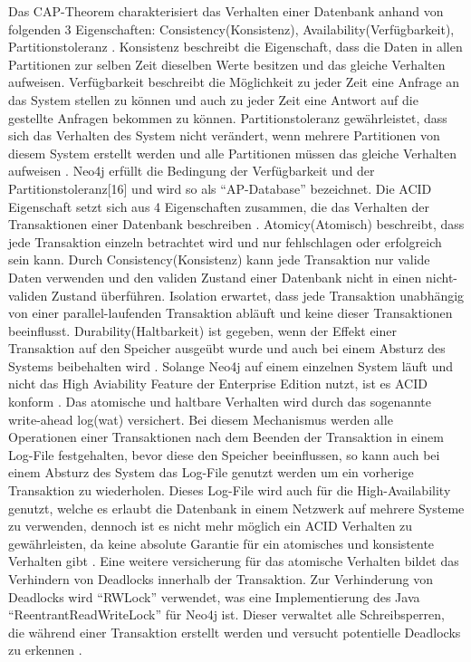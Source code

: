 Das CAP-Theorem charakterisiert  das Verhalten einer Datenbank anhand von folgenden 3 Eigenschaften: Consistency(Konsistenz), Availability(Verfügbarkeit), Partitionstoleranz \parencite{simon2000brewer}. Konsistenz beschreibt die Eigenschaft, dass die Daten in allen Partitionen zur selben Zeit dieselben Werte besitzen und das gleiche Verhalten aufweisen. Verfügbarkeit beschreibt die Möglichkeit zu jeder Zeit eine Anfrage an das System stellen zu können und auch zu jeder Zeit eine Antwort auf die gestellte Anfragen bekommen zu können. Partitionstoleranz gewährleistet, dass sich das Verhalten des System nicht verändert, wenn mehrere Partitionen von diesem System erstellt werden und alle Partitionen müssen das gleiche Verhalten aufweisen  \parencite{simon2000brewer}. Neo4j erfüllt die Bedingung der Verfügbarkeit und der  Partitionstoleranz[16] und wird so als “AP-Database” bezeichnet. \newline
Die ACID Eigenschaft setzt sich aus 4 Eigenschaften zusammen, die das Verhalten der Transaktionen einer  Datenbank beschreiben \parencite{haerder1983principles}. Atomicy(Atomisch) beschreibt, dass jede Transaktion einzeln betrachtet wird und nur fehlschlagen oder erfolgreich sein kann. Durch Consistency(Konsistenz) kann jede Transaktion nur valide Daten verwenden und den validen Zustand einer Datenbank nicht in einen nicht-validen Zustand überführen. Isolation erwartet, dass jede Transaktion unabhängig von einer parallel-laufenden Transaktion abläuft und keine dieser Transaktionen beeinflusst. Durability(Haltbarkeit) ist gegeben, wenn der Effekt einer Transaktion auf den Speicher ausgeübt wurde und auch bei einem Absturz des Systems beibehalten wird \parencite{haerder1983principles}. Solange Neo4j auf einem einzelnen System läuft und nicht das High Aviability Feature der Enterprise Edition nutzt, ist es ACID konform \parencite{holzschuher2013performance}. Das atomische und haltbare Verhalten wird durch das sogenannte write-ahead log(wat) versichert. Bei diesem Mechanismus  werden alle Operationen einer Transaktionen nach dem Beenden der Transaktion in einem Log-File  festgehalten, bevor diese  den Speicher beeinflussen, so kann auch bei einem Absturz des System das Log-File genutzt werden um ein vorherige Transaktion zu wiederholen.  Dieses Log-File wird auch für die High-Availability  genutzt, welche es erlaubt die Datenbank in einem Netzwerk auf mehrere Systeme zu verwenden, dennoch ist es nicht mehr möglich ein  ACID Verhalten zu gewährleisten, da keine absolute Garantie für ein  atomisches und konsistente Verhalten gibt \parencite{vukotic2015neo4j}. Eine weitere versicherung für das atomische Verhalten bildet das Verhindern von Deadlocks innerhalb der Transaktion. Zur Verhinderung von Deadlocks wird “RWLock” verwendet, was eine Implementierung des Java “ReentrantReadWriteLock” für Neo4j ist. Dieser verwaltet alle Schreibsperren, die während einer Transaktion erstellt werden und versucht potentielle Deadlocks zu erkennen \parencite{raj2015neo4j}.

